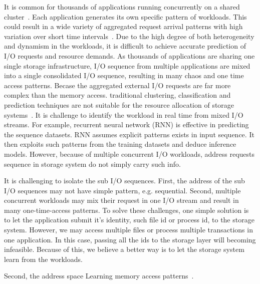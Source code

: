 It is common for thousands of applications running concurrently
on a shared cluster~\cite{stokely2012projecting}.
Each application generates its own specific pattern of workloads.
This could result in a wide variety of aggregated
request arrival patterns with high variation over short time intervals~\cite{reiss2012heterogeneity}.
Due to the high degree of both heterogeneity and dynamism in the workloads,
it is difficult to achieve accurate prediction of I/O requests and resource demands.
As thousands of applications are sharing one single storage infrastructure,
I/O sequence from multiple applications are mixed into a single consolidated I/O sequence,
resulting in many chaos and one time access patterns.
Becase the aggregated external I/O requests are far more complex than the memory access.
traditional clustering, classification and prediction techniques
are not suitable for the resource allocation of storage systems~\cite{ray2017high}.
It is challenge to identify the workload in real time from mixed I/O streams.
For example, recurrent neural network (RNN) is effective in predicting the sequence datasets.
RNN assumes explicit patterns exists in input sequence.
It then exploits such patterns from the training datasets and deduce inference models.
However, because of multiple concurrent I/O workloads, address requests sequence in storage system
do not simply carry such info.

It is challenging to isolate the sub I/O sequences.
First, the address of the sub I/O sequences may not have simple pattern, e.g. sequential.
Second, multiple concurrent workloads may mix their request in one I/O stream and result in many one-time-access patterns.
To solve these challenges, one simple solution is to let the application submit it's identity, such file id or process id, to the storage system.
However, we may access multiple files or process multiple transactions in one application.
In this case, passing all the ids to the storage layer will becoming infeasible.
Because of this, we believe a better way is to let the storage system learn from the workloads.

Second, the address space Learning memory access patterns~\cite{hashemi2018learning, peled2018towards}.

